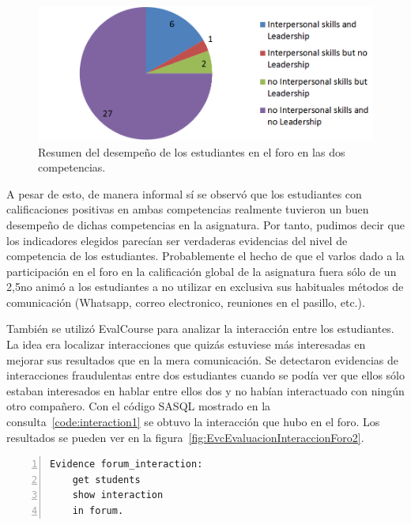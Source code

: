 \begin{figure}
	\centering
	\includegraphics[width=12cm]{EvcForo1.png}
	\caption{Resumen del desempeño de los estudiantes en el foro en las dos competencias.}
	\label{fig:EvcEvaluacionTartaForo1}
\end{figure}

A pesar de esto, de manera informal sí se observó que los estudiantes con calificaciones positivas en ambas competencias realmente tuvieron un buen desempeño de dichas competencias en la asignatura. Por tanto, pudimos decir que los indicadores elegidos parecían ser verdaderas evidencias del nivel de competencia de los estudiantes. Probablemente el hecho de que el varlos dado a la participación en el foro en la calificación global de la asignatura fuera sólo de un 2,5\percentage no animó a los estudiantes a no utilizar en exclusiva sus habituales métodos de comunicación (Whatsapp, correo electronico, reuniones en el pasillo, etc.).

También se utilizó EvalCourse para analizar la interacción entre los estudiantes. La idea era localizar interacciones que quizás estuviese más interesadas en mejorar sus resultados que en la mera comunicación. Se detectaron evidencias de interacciones fraudulentas entre dos estudiantes cuando se podía ver que ellos sólo estaban interesados en hablar entre ellos dos y no habían interactuado con ningún otro compañero. Con el código SASQL mostrado en la consulta~\ref{code:interaction1} se obtuvo la interacción que hubo en el foro. Los resultados se pueden ver en la figura~\ref{fig:EvcEvaluacionInteraccionForo2}.


\begin{lstlisting}[caption=Código SASQL para extraer datos sobre la interacción en el foro ,label=code:interaction1,numbers=left, captionpos=b, morekeywords={Evidence,get, students, show, milestones, participation, access, in, assignment, forum, campus, workshop, interaction}]
Evidence forum_interaction: 
	get students
	show interaction
	in forum.
\end{lstlisting}

